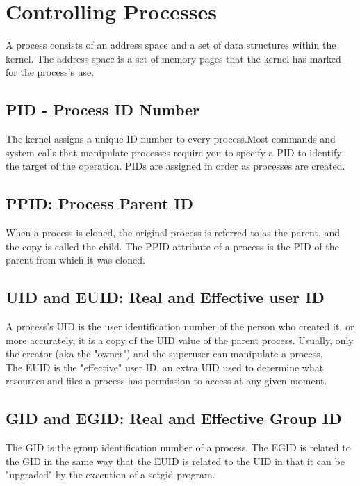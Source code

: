 \documentclass[10pt,letterpaper]{book}
\begin{document}
\section{Controlling Processes}
A process consists of an address space and a set of data structures within the kernel. The address space is a set of memory pages that the kernel has marked for
the process's use.
\subsection{PID - Process ID Number}
The kernel assigns a unique ID number to every process.Most commands and
system calls that manipulate processes require you to specify a PID to identify the
target of the operation. PIDs are assigned in order as processes are created.
\subsection{PPID: Process Parent ID}
When a process is cloned, the original process is referred to as the parent, and the
copy is called the child. The PPID attribute of a process is the PID of the parent
from which it was cloned.
\subsection{UID and EUID: Real and Effective user ID}
A process's UID is the user identification number of the person who created it, or
more accurately, it is a copy of the UID value of the parent process. Usually, only
the creator (aka the "owner") and the superuser can manipulate a process.\\
The EUID is the "effective" user ID, an extra UID used to determine what resources and files a process has permission to access at any given moment.
\subsection{GID and EGID: Real and Effective Group ID}
The GID is the group identification number of a process. The EGID is related to
the GID in the same way that the EUID is related to the UID in that it can be
"upgraded" by the execution of a setgid program.
\end{document}
